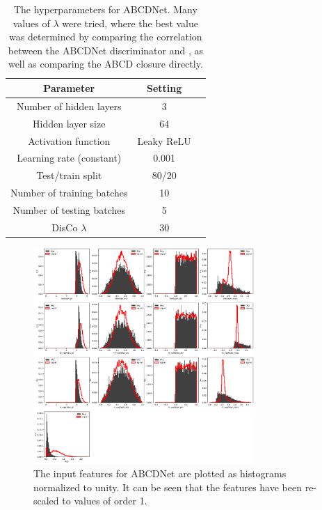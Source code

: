 \begin{table}[htbp]
    \begin{center}

    \begin{tabular}{ccc}
    \toprule
    Parameter & Setting \\
    \midrule
    Number of hidden layers    & 3          \\
    Hidden layer size          & 64         \\
    Activation function        & Leaky ReLU \\
    Learning rate (constant)   & 0.001      \\
    Test/train split           & 80/20      \\
    Number of training batches & 10         \\
    Number of testing batches  & 5          \\
    DisCo $\lambda$            & 30         \\
    \bottomrule
    \end{tabular}

    \end{center}
    \caption{
        The hyperparameters for ABCDNet. 
        Many values of $\lambda$ were tried, where the best value was determined by comparing the correlation between the ABCDNet discriminator and \detajj, as well as comparing the ABCD closure directly. 
    }
    \label{tab:vbsvvh_abcdnet_params}
\end{table}

\begin{figure}[htb]
    \centering
    \includegraphics[width=0.75\textwidth]{fig/vbsvvh/all_features.pdf}
    \caption{
        The input features for ABCDNet are plotted as histograms normalized to unity. 
        It can be seen that the features have been re-scaled to values of order 1.
    }
    \label{fig:vbsvvh_abcdnet_inputs}
\end{figure}

